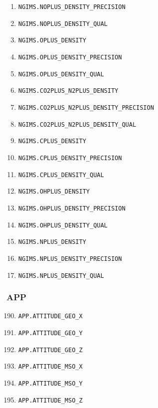 \documentclass{article}
\begin{document}
\begin{enumerate}
    \item \texttt{NGIMS.NOPLUS\_DENSITY\_PRECISION}
    \item \texttt{NGIMS.NOPLUS\_DENSITY\_QUAL}
    \item \texttt{NGIMS.OPLUS\_DENSITY}
    \item \texttt{NGIMS.OPLUS\_DENSITY\_PRECISION}
    \item \texttt{NGIMS.OPLUS\_DENSITY\_QUAL}
    \item \texttt{NGIMS.CO2PLUS\_N2PLUS\_DENSITY}
    \item \texttt{NGIMS.CO2PLUS\_N2PLUS\_DENSITY\_PRECISION}
    \item \texttt{NGIMS.CO2PLUS\_N2PLUS\_DENSITY\_QUAL}
    \item \texttt{NGIMS.CPLUS\_DENSITY}
    \item \texttt{NGIMS.CPLUS\_DENSITY\_PRECISION}
    \item \texttt{NGIMS.CPLUS\_DENSITY\_QUAL}
    \item \texttt{NGIMS.OHPLUS\_DENSITY}
    \item \texttt{NGIMS.OHPLUS\_DENSITY\_PRECISION}
    \item \texttt{NGIMS.OHPLUS\_DENSITY\_QUAL}
    \item \texttt{NGIMS.NPLUS\_DENSITY}
    \item \texttt{NGIMS.NPLUS\_DENSITY\_PRECISION}
    \item \texttt{NGIMS.NPLUS\_DENSITY\_QUAL}
\end{enumerate}

\subsubsection{APP}
\begin{enumerate}
\setcounter{enumi}{189}
    \item \texttt{APP.ATTITUDE\_GEO\_X}
    \item \texttt{APP.ATTITUDE\_GEO\_Y}
    \item \texttt{APP.ATTITUDE\_GEO\_Z}
    \item \texttt{APP.ATTITUDE\_MSO\_X}
    \item \texttt{APP.ATTITUDE\_MSO\_Y}
    \item \texttt{APP.ATTITUDE\_MSO\_Z}
\end{enumerate}
\end{document}
